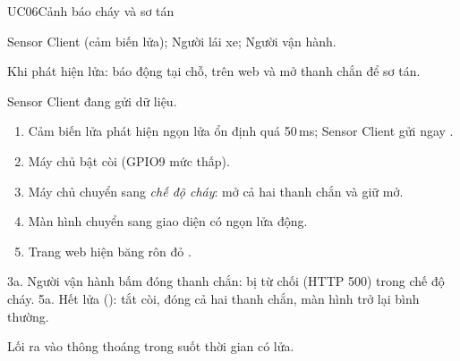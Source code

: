 \begin{usecase}{UC06}{Cảnh báo cháy và sơ tán}
\item[Tác nhân] Sensor Client (cảm biến lửa); Người lái xe; Người vận hành.
\item[Mô tả] Khi phát hiện lửa: báo động tại chỗ, trên web và mở thanh chắn để sơ tán.
\item[Tiền điều kiện] Sensor Client đang gửi dữ liệu.
\item[Luồng chính] \begin{enumerate}[nosep,leftmargin=1.3em]
  \item Cảm biến lửa phát hiện ngọn lửa ổn định quá 50\,ms; Sensor Client gửi ngay .
  \item Máy chủ bật còi (GPIO9 mức thấp).
  \item Máy chủ chuyển sang \emph{chế độ cháy}: mở cả hai thanh chắn và giữ mở.
  \item Màn hình chuyển sang giao diện  có ngọn lửa động.
  \item Trang web hiện băng rôn đỏ .
\end{enumerate}
\item[Ngoại lệ] 3a. Người vận hành bấm đóng thanh chắn: bị từ chối (HTTP 500) trong chế độ cháy.
  5a. Hết lửa (): tắt còi, đóng cả hai thanh chắn, màn hình trở lại bình thường.
\item[Hậu điều kiện] Lối ra vào thông thoáng trong suốt thời gian có lửa.
\end{usecase}


